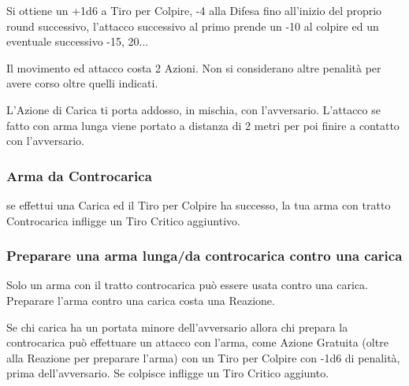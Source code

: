\begin{multicols}{2}
Si ottiene un +1d6 a Tiro per Colpire, -4 alla Difesa fino all'inizio del proprio round successivo, l'attacco successivo al primo prende un -10 al colpire ed un eventuale successivo -15, 20...

Il movimento ed attacco costa 2 Azioni. Non si considerano altre penalità per avere corso oltre quelli indicati.

L'Azione di Carica ti porta addosso, in mischia, con l'avversario. L'attacco se fatto con arma lunga viene portato a distanza di 2 metri per poi finire a contatto con l'avversario.



\subsubsection{Arma da Controcarica}\label{controcarica}\label{caricaarmadacontrocarica}

se effettui una Carica ed il Tiro per Colpire ha successo, la tua arma con tratto Controcarica infligge un Tiro Critico aggiuntivo.


\subsubsection{Preparare una arma lunga/da controcarica contro una carica} \label{prepararearmalungacontrocarica}

Solo un arma con il tratto controcarica può essere usata contro una carica. Preparare l'arma contro una carica costa una Reazione.

Se chi carica ha un portata minore dell'avversario allora chi prepara la controcarica può effettuare un attacco con l'arma, come Azione Gratuita (oltre alla Reazione per preparare l'arma) con un Tiro per Colpire con -1d6 di penalità, prima dell'avversario. Se colpisce infligge un Tiro Critico aggiunto.


%


\end{multicols}
